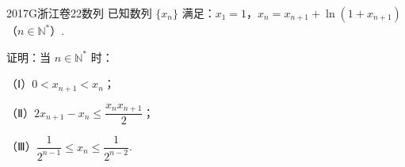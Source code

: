 
\begin{problem}{2017}{G}{浙江卷}{22}{数列}
已知数列 $\{x_n\}$ 满足：$x_1=1$，$x_n=x_{n+1}+\ln(1+x_{n+1})$（$n\in\mathbb{N}^*$）.

证明：当 $n\in\mathbb{N}^*$ 时：

（Ⅰ）$0<x_{n+1}<x_n$；

（Ⅱ）$2x_{n+1}-x_n\leqslant\dfrac{x_n x_{n+1}}{2}$；

（Ⅲ）$\dfrac{1}{2^{n-1}}\leqslant x_n\leqslant\dfrac{1}{2^{n-2}}$.
\end{problem}